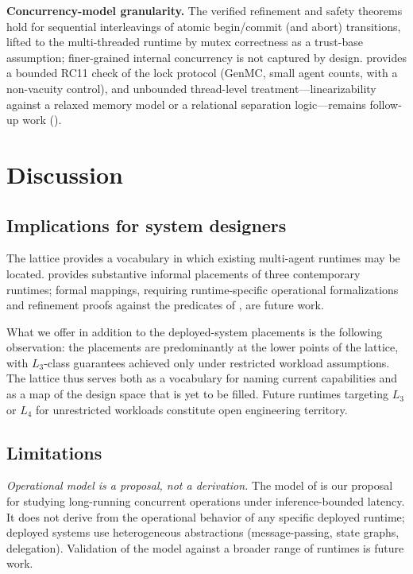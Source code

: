 \documentclass[journal,compsoc,10pt]{IEEEtran}
\theoremstyle{definition}
\theoremstyle{remark}
\begin{document}
\medskip
\noindent\textbf{Concurrency-model granularity.}
The verified refinement and safety theorems hold for sequential
interleavings of atomic begin/commit (and abort) transitions, lifted to
the multi-threaded runtime by mutex correctness as a trust-base
assumption; finer-grained internal concurrency is not captured by design.
 provides a bounded RC11 check of the lock
protocol (GenMC, small agent counts, with a non-vacuity control), and
unbounded thread-level treatment---linearizability against a relaxed
memory model or a relational separation logic---remains follow-up work
().

\section{Discussion}
\label{sec:discussion}

\subsection{Implications for system designers}
\label{sec:implications}
The lattice provides a vocabulary in which existing multi-agent
runtimes may be located.  provides
substantive informal placements of three contemporary runtimes;
formal mappings, requiring runtime-specific operational
formalizations and refinement proofs against the predicates of
, are future work.

What we offer in addition to the deployed-system placements is the
following observation: the placements are predominantly at the lower
points of the lattice, with $L_3$-class guarantees achieved only
under restricted workload assumptions. The lattice thus serves
both as a vocabulary for naming current capabilities and as a map of
the design space that is yet to be filled. Future runtimes targeting
$L_3$ or $L_4$ for unrestricted workloads constitute open
engineering territory.

\subsection{Limitations}
\label{sec:limitations}
\emph{Operational model is a proposal, not a derivation.}
The model of  is our proposal for studying
long-running concurrent operations under inference-bounded latency.
It does not derive from the operational behavior of any specific
deployed runtime; deployed systems use heterogeneous abstractions
(message-passing, state graphs, delegation). Validation of the model
against a broader range of runtimes is future work.
\end{document}
